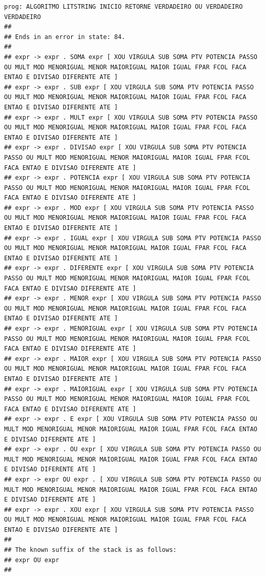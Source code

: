 \documentclass[hidelinks,12pt]{article}
\begin{document}
\begin{lstlisting}
prog: ALGORITMO LITSTRING INICIO RETORNE VERDADEIRO OU VERDADEIRO VERDADEIRO 
##
## Ends in an error in state: 84.
##
## expr -> expr . SOMA expr [ XOU VIRGULA SUB SOMA PTV POTENCIA PASSO OU MULT MOD MENORIGUAL MENOR MAIORIGUAL MAIOR IGUAL FPAR FCOL FACA ENTAO E DIVISAO DIFERENTE ATE ]
## expr -> expr . SUB expr [ XOU VIRGULA SUB SOMA PTV POTENCIA PASSO OU MULT MOD MENORIGUAL MENOR MAIORIGUAL MAIOR IGUAL FPAR FCOL FACA ENTAO E DIVISAO DIFERENTE ATE ]
## expr -> expr . MULT expr [ XOU VIRGULA SUB SOMA PTV POTENCIA PASSO OU MULT MOD MENORIGUAL MENOR MAIORIGUAL MAIOR IGUAL FPAR FCOL FACA ENTAO E DIVISAO DIFERENTE ATE ]
## expr -> expr . DIVISAO expr [ XOU VIRGULA SUB SOMA PTV POTENCIA PASSO OU MULT MOD MENORIGUAL MENOR MAIORIGUAL MAIOR IGUAL FPAR FCOL FACA ENTAO E DIVISAO DIFERENTE ATE ]
## expr -> expr . POTENCIA expr [ XOU VIRGULA SUB SOMA PTV POTENCIA PASSO OU MULT MOD MENORIGUAL MENOR MAIORIGUAL MAIOR IGUAL FPAR FCOL FACA ENTAO E DIVISAO DIFERENTE ATE ]
## expr -> expr . MOD expr [ XOU VIRGULA SUB SOMA PTV POTENCIA PASSO OU MULT MOD MENORIGUAL MENOR MAIORIGUAL MAIOR IGUAL FPAR FCOL FACA ENTAO E DIVISAO DIFERENTE ATE ]
## expr -> expr . IGUAL expr [ XOU VIRGULA SUB SOMA PTV POTENCIA PASSO OU MULT MOD MENORIGUAL MENOR MAIORIGUAL MAIOR IGUAL FPAR FCOL FACA ENTAO E DIVISAO DIFERENTE ATE ]
## expr -> expr . DIFERENTE expr [ XOU VIRGULA SUB SOMA PTV POTENCIA PASSO OU MULT MOD MENORIGUAL MENOR MAIORIGUAL MAIOR IGUAL FPAR FCOL FACA ENTAO E DIVISAO DIFERENTE ATE ]
## expr -> expr . MENOR expr [ XOU VIRGULA SUB SOMA PTV POTENCIA PASSO OU MULT MOD MENORIGUAL MENOR MAIORIGUAL MAIOR IGUAL FPAR FCOL FACA ENTAO E DIVISAO DIFERENTE ATE ]
## expr -> expr . MENORIGUAL expr [ XOU VIRGULA SUB SOMA PTV POTENCIA PASSO OU MULT MOD MENORIGUAL MENOR MAIORIGUAL MAIOR IGUAL FPAR FCOL FACA ENTAO E DIVISAO DIFERENTE ATE ]
## expr -> expr . MAIOR expr [ XOU VIRGULA SUB SOMA PTV POTENCIA PASSO OU MULT MOD MENORIGUAL MENOR MAIORIGUAL MAIOR IGUAL FPAR FCOL FACA ENTAO E DIVISAO DIFERENTE ATE ]
## expr -> expr . MAIORIGUAL expr [ XOU VIRGULA SUB SOMA PTV POTENCIA PASSO OU MULT MOD MENORIGUAL MENOR MAIORIGUAL MAIOR IGUAL FPAR FCOL FACA ENTAO E DIVISAO DIFERENTE ATE ]
## expr -> expr . E expr [ XOU VIRGULA SUB SOMA PTV POTENCIA PASSO OU MULT MOD MENORIGUAL MENOR MAIORIGUAL MAIOR IGUAL FPAR FCOL FACA ENTAO E DIVISAO DIFERENTE ATE ]
## expr -> expr . OU expr [ XOU VIRGULA SUB SOMA PTV POTENCIA PASSO OU MULT MOD MENORIGUAL MENOR MAIORIGUAL MAIOR IGUAL FPAR FCOL FACA ENTAO E DIVISAO DIFERENTE ATE ]
## expr -> expr OU expr . [ XOU VIRGULA SUB SOMA PTV POTENCIA PASSO OU MULT MOD MENORIGUAL MENOR MAIORIGUAL MAIOR IGUAL FPAR FCOL FACA ENTAO E DIVISAO DIFERENTE ATE ]
## expr -> expr . XOU expr [ XOU VIRGULA SUB SOMA PTV POTENCIA PASSO OU MULT MOD MENORIGUAL MENOR MAIORIGUAL MAIOR IGUAL FPAR FCOL FACA ENTAO E DIVISAO DIFERENTE ATE ]
##
## The known suffix of the stack is as follows:
## expr OU expr 
##


\end{lstlisting}
\end{document}
